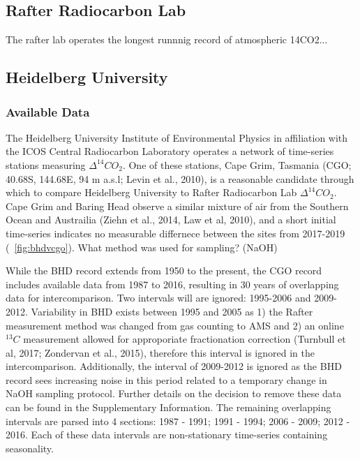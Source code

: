 \documentclass{BrJG_submit}
\begin{document}
\subsection{Rafter Radiocarbon Lab}

The rafter lab operates the longest runnnig record of atmospheric 14CO2...

\subsection{Heidelberg University}
\subsubsection{Available Data}

The Heidelberg University Institute of Environmental Physics in affiliation with the ICOS Central Radiocarbon Laboratory operates a network of time-series stations measuring ${\Delta^{14}CO_{2}}$. One of these stations, Cape Grim, Tasmania (CGO; 40.68S, 144.68E, 94 m a.s.l; Levin et al., 2010), is a reasonable candidate through which to compare Heidelberg University to Rafter Radiocarbon Lab ${\Delta^{14}CO_{2}}$. Cape Grim and Baring Head observe a similar mixture of air from the Southern Ocean and Austrailia (Ziehn et al., 2014, Law et al, 2010), and a short initial time-series indicates no measurable differnece between the sites from 2017-2019 (~\ref{fig:bhdvcgo}). 
What method was used for sampling? (NaOH)


While the BHD record extends from 1950 to the present, the CGO record includes available data from 1987 to 2016, resulting in 30 years of overlapping data for intercomparison. 
Two intervals will are ignored: 1995-2006 and 2009-2012.
Variability in BHD exists between 1995 and 2005 as 1) the Rafter measurement method was changed from gas counting to AMS and 2) an online $^{13}C$ measurement allowed for approporiate fractionation correction (Turnbull et al, 2017; Zondervan et al., 2015), therefore this interval is ignored in the intercomparison. 
Additionally, the interval of 2009-2012 is ignored as the BHD record sees increasing noise in this period related to a temporary change in NaOH sampling protocol. Further details on the decision to remove these data can be found in the Supplementary Information. 
The remaining overlapping intervals are parsed into 4 sections: 1987 - 1991; 1991 - 1994; 2006 - 2009; 2012 - 2016. 
Each of these data intervals are non-stationary time-series containing seasonality. 
\end{document}
